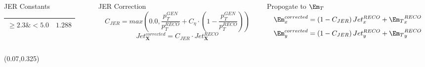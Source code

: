 \begin{frame}
\begin{columns}[T]
\begin{column}{0.27\textwidth}
\begin{block}{JER Constants}
\begin{table}[ht]
\begin{tabular}{| l | l |}
						$\geqslant2.3\&<5.0$ & $1.288$\\
						\hline\hline
					\end{tabular}
					\label{tab:jer}
					\vspace*{-0.3cm}
				\end{table}
			\end{block}
    	\end{column}
    	\begin{column}{0.32\textwidth}
    		\begin{block}{JER Correction}
    			\Tiny
    			\begin{equation}
				\label{eq:C_JER}
				C_{JER}=max\left(0.0,\frac{p_{T}^{GEN}}{p_{T}^{RECO}}+C_{\eta}\cdot\left(1-\frac{p_{T}^{GEN}}{p_{T}^{RECO}}\right)\right)
				\end{equation}
				\begin{equation}
				\label{eq:Jet_JER}
				Jet_{\textbf{X}}^{corrected}=C_{JER}{\cdot}Jet_{\textbf{X}}^{RECO}
				\end{equation}
    		\end{block}
    	\end{column}
    	\begin{column}{0.34\textwidth}
    		\begin{block}{Propogate to $\Em_{T}$}
    			\tiny
    			\begin{equation}
				\Em_{x}^{corrected}=\left(1-C_{JER}\right)Jet_{x}^{RECO}+{\Em_{T}}_{x}^{RECO}\label{eq:MET_JER_X}
				\end{equation}
				\begin{equation}
				\Em_{y}^{corrected}=\left(1-C_{JER}\right)Jet_{y}^{RECO}+{\Em_{T}}_{y}^{RECO}\label{eq:MET_JER_Y}
				\end{equation}
    		\end{block}
    	\end{column}
    \end{columns}
	\begin{textblock}{1.0}(0.07,0.325)
		\begin{figure}
			\centering
			\scalebox{0.6}{}
			\label{fig:factorized_approach}
		\end{figure}
	\end{textblock}
\end{frame}

